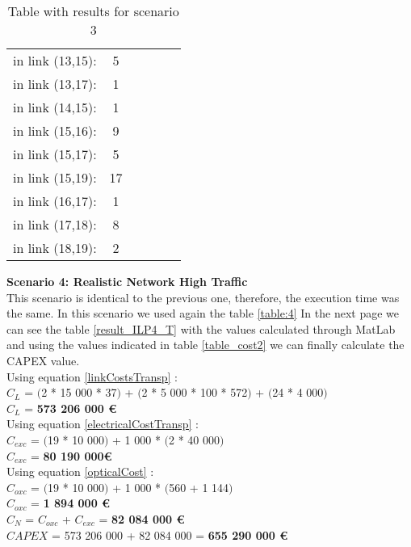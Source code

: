 \begin{table}[h!]
\begin{tabular}{|| c | c || c | c || c | c ||}
in link (13,15): & 5& & & & \\
in link (13,17): & 1& & & & \\
in link (14,15): & 1& & & & \\
in link (15,16): & 9& & & & \\
in link (15,17): & 5& & & & \\
in link (15,19): & 17& & & & \\
in link (16,17): & 1& & & & \\
in link (17,18): & 8& & & & \\
in link (18,19): & 2& & & & \\
\hline
\end{tabular}
\caption{Table with results  for scenario 3}
\label{result_ILP3_T}
\end{table}

\newpage
\textbf{Scenario 4: Realistic Network High Traffic} \label{Scenario4_transp} \\

This scenario is identical to the previous one, therefore, the execution time was the same. In this scenario we used again the table \ref{table:4} In the next page we can see the table \ref{result_ILP4_T} with the values calculated through MatLab and using the values indicated in table \ref{table_cost2} we can finally calculate the CAPEX value. \\

Using equation \ref{linkCostsTransp} : \\
$C_L$ = $($2 * 15 000 * 37$)$ + $($2 * 5 000 * 100 * 572$)$ + $($24 * 4 000$)$ \\
$C_L$ = \textbf{573 206 000 \euro} \\

Using equation \ref{electricalCostTransp} : \\
$C_{exc}$ = $($19 * 10 000$)$ + 1 000 * $($2 * 40 000$)$ \\
$C_{exc}$ = \textbf{80 190 000\euro} \\

Using equation \ref{opticalCost} : \\
$C_{oxc}$ = $($19 * 10 000$)$ + 1 000 * $($560 + 1 144$)$ \\
$C_{oxc}$ = \textbf{1 894 000 \euro} \\
$C_N$ = $C_{oxc}$ + $C_{exc}$ = \textbf{82 084 000 \euro} \\

$CAPEX$ = 573 206 000 + 82 084 000 = \textbf{655 290 000 \euro}\\

